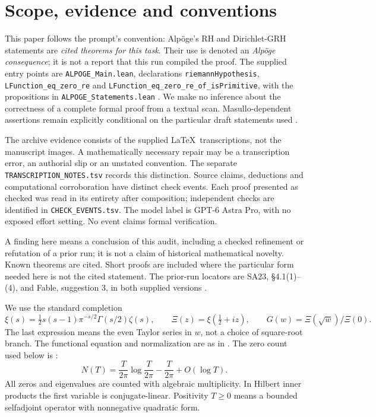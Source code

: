 \documentclass[11pt,a4paper]{article}
\newcommand{\src}[1]{\texttt{#1}}
\begin{document}
\section{Scope, evidence and conventions}
This paper follows the prompt's convention: Alp\"oge's RH and Dirichlet-GRH statements are \emph{cited theorems for this task}. Their use is denoted an \emph{Alp\"oge consequence}; it is not a report that this run compiled the proof. The supplied entry points are \src{ALPOGE\_Main.lean}, declarations \src{riemannHypothesis}, \src{LFunction\_eq\_zero\_re} and \src{LFunction\_eq\_zero\_re\_of\_isPrimitive}, with the propositions in \src{ALPOGE\_Statements.lean} \cite{alpoge,lean}. We make no inference about the correctness of a complete formal proof from a textual scan. Masullo-dependent assertions remain explicitly conditional on the particular draft statements used \cite{masullo}.

The archive evidence consists of the supplied \LaTeX\ transcriptions, not the manuscript images. A mathematically necessary repair may be a transcription error, an authorial slip or an unstated convention. The separate \src{TRANSCRIPTION\_NOTES.tsv} records this distinction. Source claims, deductions and computational corroboration have distinct check events. Each proof presented as checked was read in its entirety after composition; independent checks are identified in \src{CHECK\_EVENTS.tsv}. The model label is GPT-6 Astra Pro, with no exposed effort setting. No event claims formal verification.

A finding here means a conclusion of this audit, including a checked refinement or refutation of a prior run; it is not a claim of historical mathematical novelty. Known theorems are cited. Short proofs are included where the particular form needed here is not the cited statement. The prior-run locators are SA23, \S4.1(1)--(4), and Fable, suggestion 3, in both supplied versions \cite{sa23,fable}.

We use the standard completion
\[
 \xi(s)=\tfrac12s(s-1)\pi^{-s/2}\Gamma(s/2)\zeta(s),\qquad
 \Xi(z)=\xi(\tfrac12+iz),\qquad G(w)=\Xi(\sqrt w)/\Xi(0).
\]
The last expression means the even Taylor series in $w$, not a choice of square-root branch. The functional equation and normalization are as in \cite[\S2.1, (2.1.12)--(2.1.14); \S2.12]{titch}. The zero count used below is \cite[Theorem 9.4, (9.4.3), p.~214]{titch}:
\[
 N(T)=\frac{T}{2\pi}\log\frac{T}{2\pi}-\frac{T}{2\pi}+O(\log T).
\]
All zeros and eigenvalues are counted with algebraic multiplicity. In Hilbert inner products the first variable is conjugate-linear. Positivity $T\ge0$ means a bounded selfadjoint operator with nonnegative quadratic form.
\end{document}
